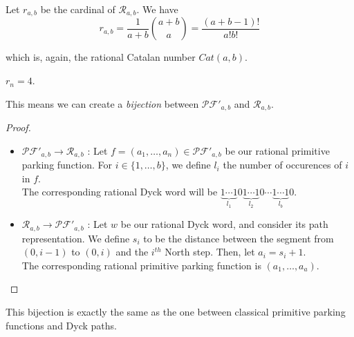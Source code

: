 \begin{theorem}[Bizley, 1954]
    Let $r_{a,b}$ be the cardinal of $\mathcal{R}_{a,b}$.
    We have $$r_{a,b} = \frac{1}{a+b} \binom {a+b}{a} =
    \frac{(a+b-1)!}{a!b!}$$
\end{theorem}

which is, again, the rational Catalan number $Cat(a,b)$.

\begin{example}[$a = 7, b = 2$]
    $r_n = 4$.
    \begin{center}
        
        
        
        
    \end{center}
\end{example}

\begin{prop}
    This means we can create a \emph{bijection} between
    $\mathcal{PF'}_{a,b}$ and $\mathcal{R}_{a,b}$.
\end{prop}

\begin{proof}
    ~\
\begin{itemize}
    \item $\mathcal{PF'}_{a,b} \to \mathcal{R}_{a,b}$ :
    Let $f = (a_1, \ldots, a_n) \in \mathcal{PF'}_{a,b}$
    be our rational primitive parking function.
    For $i \in \{1, \ldots, b\}$, we define $l_i$ the
    number of occurences of $i$ in $f$.\\
    The corresponding rational Dyck word will be
    $\underbrace{1 \cdots 1}_{l_1}0
     \underbrace{1 \cdots 1}_{l_2}0 \cdots
     \underbrace{1 \cdots 1}_{l_b}0$.
    
    \item $\mathcal{R}_{a,b} \to \mathcal{PF'}_{a,b}$ :
    Let $w$ be our rational Dyck word, and consider its path
    representation. We define $s_i$ to be the distance
    between the segment from $(0, i - 1)$ to $(0, i)$
    and the $i^{th}$ North step. Then, let $a_i = s_i + 1$.\\
    The corresponding rational primitive parking function is 
    $(a_1, \ldots, a_a)$.
\end{itemize}
\end{proof}

\begin{rem}
    This bijection is exactly the same as the one between
    classical primitive parking functions and Dyck paths.
\end{rem}

